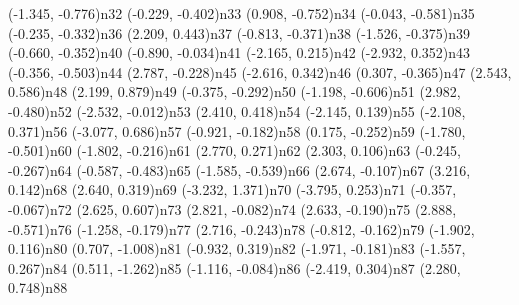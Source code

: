 \dotnode[dotstyle=Bsquare](-1.345, -0.776){n32}
\dotnode[dotstyle=Bsquare](-0.229, -0.402){n33}
\dotnode[dotstyle=Bsquare](0.908, -0.752){n34}
\dotnode[dotstyle=Bsquare](-0.043, -0.581){n35}
\dotnode[dotstyle=Bsquare](-0.235, -0.332){n36}
\dotnode[dotstyle=Bo](2.209, 0.443){n37}
\dotnode[dotstyle=Bsquare](-0.813, -0.371){n38}
\dotnode[dotstyle=Bsquare](-1.526, -0.375){n39}
\dotnode[dotstyle=Bsquare](-0.660, -0.352){n40}
\dotnode[dotstyle=Bsquare](-0.890, -0.034){n41}
\dotnode[dotstyle=Btriangle](-2.165, 0.215){n42}
\dotnode[dotstyle=Btriangle](-2.932, 0.352){n43}
\dotnode[dotstyle=Bsquare](-0.356, -0.503){n44}
\dotnode[dotstyle=Bo](2.787, -0.228){n45}
\dotnode[dotstyle=Btriangle](-2.616, 0.342){n46}
\dotnode[dotstyle=Bsquare](0.307, -0.365){n47}
\dotnode[dotstyle=Bo](2.543, 0.586){n48}
\dotnode[dotstyle=Bo](2.199, 0.879){n49}
\dotnode[dotstyle=Bsquare](-0.375, -0.292){n50}
\dotnode[dotstyle=Bsquare](-1.198, -0.606){n51}
\dotnode[dotstyle=Bo](2.982, -0.480){n52}
\dotnode[dotstyle=Btriangle](-2.532, -0.012){n53}
\dotnode[dotstyle=Bo](2.410, 0.418){n54}
\dotnode[dotstyle=Btriangle](-2.145, 0.139){n55}
\dotnode[dotstyle=Btriangle](-2.108, 0.371){n56}
\dotnode[dotstyle=Btriangle](-3.077, 0.686){n57}
\dotnode[dotstyle=Bsquare](-0.921, -0.182){n58}
\dotnode[dotstyle=Bsquare](0.175, -0.252){n59}
\dotnode[dotstyle=Btriangle](-1.780, -0.501){n60}
\dotnode[dotstyle=Btriangle](-1.802, -0.216){n61}
\dotnode[dotstyle=Bo](2.770, 0.271){n62}
\dotnode[dotstyle=Bo](2.303, 0.106){n63}
\dotnode[dotstyle=Bsquare](-0.245, -0.267){n64}
\dotnode[dotstyle=Bsquare](-0.587, -0.483){n65}
\dotnode[dotstyle=Bsquare](-1.585, -0.539){n66}
\dotnode[dotstyle=Bo](2.674, -0.107){n67}
\dotnode[dotstyle=Bo](3.216, 0.142){n68}
\dotnode[dotstyle=Bo](2.640, 0.319){n69}
\dotnode[dotstyle=Btriangle](-3.232, 1.371){n70}
\dotnode[dotstyle=Btriangle](-3.795, 0.253){n71}
\dotnode[dotstyle=Bsquare](-0.357, -0.067){n72}
\dotnode[dotstyle=Bo](2.625, 0.607){n73}
\dotnode[dotstyle=Bo](2.821, -0.082){n74}
\dotnode[dotstyle=Bo](2.633, -0.190){n75}
\dotnode[dotstyle=Bo](2.888, -0.571){n76}
\dotnode[dotstyle=Bsquare](-1.258, -0.179){n77}
\dotnode[dotstyle=Bo](2.716, -0.243){n78}
\dotnode[dotstyle=Bsquare](-0.812, -0.162){n79}
\dotnode[dotstyle=Btriangle](-1.902, 0.116){n80}
\dotnode[dotstyle=Bsquare](0.707, -1.008){n81}
\dotnode[dotstyle=Bsquare](-0.932, 0.319){n82}
\dotnode[dotstyle=Btriangle](-1.971, -0.181){n83}
\dotnode[dotstyle=Btriangle](-1.557, 0.267){n84}
\dotnode[dotstyle=Bsquare](0.511, -1.262){n85}
\dotnode[dotstyle=Bsquare](-1.116, -0.084){n86}
\dotnode[dotstyle=Btriangle](-2.419, 0.304){n87}
\dotnode[dotstyle=Bo](2.280, 0.748){n88}
